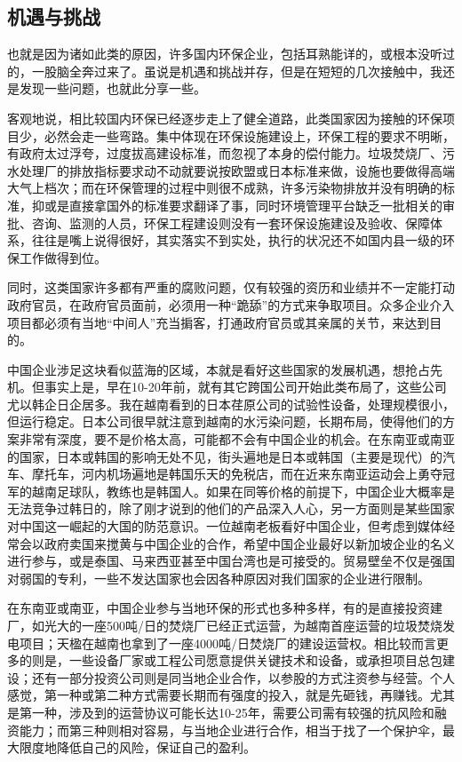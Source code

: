 \documentclass[]{book}
\begin{document}
\hypertarget{ux673aux9047ux4e0eux6311ux6218}{%
\subsection{机遇与挑战}\label{ux673aux9047ux4e0eux6311ux6218}}

也就是因为诸如此类的原因，许多国内环保企业，包括耳熟能详的，或根本没听过的，一股脑全奔过来了。虽说是机遇和挑战并存，但是在短短的几次接触中，我还是发现一些问题，也就此分享一些。

客观地说，相比较国内环保已经逐步走上了健全道路，此类国家因为接触的环保项目少，必然会走一些弯路。集中体现在环保设施建设上，环保工程的要求不明晰，有政府太过浮夸，过度拔高建设标准，而忽视了本身的偿付能力。垃圾焚烧厂、污水处理厂的排放指标要求动不动就要说按欧盟或日本标准来做，设施也要做得高端大气上档次；而在环保管理的过程中则很不成熟，许多污染物排放并没有明确的标准，抑或是直接拿国外的标准要求翻译了事，同时环境管理平台缺乏一批相关的审批、咨询、监测的人员，环保工程建设则没有一套环保设施建设及验收、保障体系，往往是嘴上说得很好，其实落实不到实处，执行的状况还不如国内县一级的环保工作做得到位。

同时，这类国家许多都有严重的腐败问题，仅有较强的资历和业绩并不一定能打动政府官员，在政府官员面前，必须用一种``跪舔''的方式来争取项目。众多企业介入项目都必须有当地``中间人''充当掮客，打通政府官员或其亲属的关节，来达到目的。

中国企业涉足这块看似蓝海的区域，本就是看好这些国家的发展机遇，想抢占先机。但事实上是，早在10-20年前，就有其它跨国公司开始此类布局了，这些公司尤以韩企日企居多。我在越南看到的日本荏原公司的试验性设备，处理规模很小，但运行稳定。日本公司很早就注意到越南的水污染问题，长期布局，使得他们的方案非常有深度，要不是价格太高，可能都不会有中国企业的机会。在东南亚或南亚的国家，日本或韩国的影响无处不见，街头遍地是日本或韩国（主要是现代）的汽车、摩托车，河内机场遍地是韩国乐天的免税店，而在近来东南亚运动会上勇夺冠军的越南足球队，教练也是韩国人。如果在同等价格的前提下，中国企业大概率是无法竞争过韩日的，除了刚才说到的他们的产品深入人心，另一方面则是某些国家对中国这一崛起的大国的防范意识。一位越南老板看好中国企业，但考虑到媒体经常会以政府卖国来搅黄与中国企业的合作，希望中国企业最好以新加坡企业的名义进行参与，或是泰国、马来西亚甚至中国台湾也是可接受的。贸易壁垒不仅是强国对弱国的专利，一些不发达国家也会因各种原因对我们国家的企业进行限制。

在东南亚或南亚，中国企业参与当地环保的形式也多种多样，有的是直接投资建厂，如光大的一座500吨/日的焚烧厂已经正式运营，为越南首座运营的垃圾焚烧发电项目；天楹在越南也拿到了一座4000吨/日焚烧厂的建设运营权。相比较而言更多的则是，一些设备厂家或工程公司愿意提供关键技术和设备，或承担项目总包建设；还有一部分投资公司则是同当地企业合作，以参股的方式注资参与经营。个人感觉，第一种或第二种方式需要长期而有强度的投入，就是先砸钱，再赚钱。尤其是第一种，涉及到的运营协议可能长达10-25年，需要公司需有较强的抗风险和融资能力；而第三种则相对容易，与当地企业进行合作，相当于找了一个保护伞，最大限度地降低自己的风险，保证自己的盈利。
\end{document}
